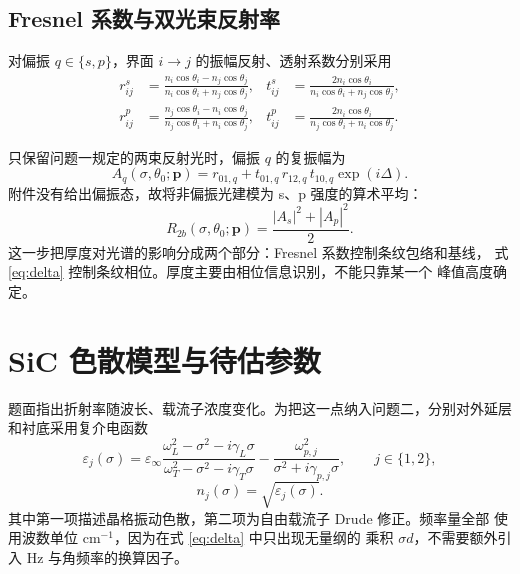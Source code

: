 \documentclass[UTF8,12pt,a4paper]{ctexart}
\begin{document}
\subsection{Fresnel 系数与双光束反射率}

对偏振 $q\in\{s,p\}$，界面 $i\to j$ 的振幅反射、透射系数分别采用
\begin{align}
 r_{ij}^{s}&=\frac{n_i\cos\theta_i-n_j\cos\theta_j}
 {n_i\cos\theta_i+n_j\cos\theta_j},
 &t_{ij}^{s}&=\frac{2n_i\cos\theta_i}
 {n_i\cos\theta_i+n_j\cos\theta_j},\\
 r_{ij}^{p}&=\frac{n_j\cos\theta_i-n_i\cos\theta_j}
 {n_j\cos\theta_i+n_i\cos\theta_j},
 &t_{ij}^{p}&=\frac{2n_i\cos\theta_i}
 {n_j\cos\theta_i+n_i\cos\theta_j}.
 \label{eq:fresnel}
\end{align}

只保留问题一规定的两束反射光时，偏振 $q$ 的复振幅为
\begin{equation}
 A_q(\sigma,\theta_0;\boldsymbol p)
 =r_{01,q}+t_{01,q}\,r_{12,q}\,t_{10,q}\exp\!\left(i\Delta\right).
 \label{eq:amplitude}
\end{equation}
附件没有给出偏振态，故将非偏振光建模为 s、p 强度的算术平均：
\begin{equation}
 R_{2b}(\sigma,\theta_0;\boldsymbol p)
 =\frac{|A_s|^2+|A_p|^2}{2}.
 \label{eq:reflectance}
\end{equation}
这一步把厚度对光谱的影响分成两个部分：Fresnel 系数控制条纹包络和基线，
式 \eqref{eq:delta} 控制条纹相位。厚度主要由相位信息识别，不能只靠某一个
峰值高度确定。

\section{SiC 色散模型与待估参数}

题面指出折射率随波长、载流子浓度变化。为把这一点纳入问题二，分别对外延层
和衬底采用复介电函数
\begin{equation}
 \varepsilon_j(\sigma)=\varepsilon_\infty
 \frac{\omega_L^2-\sigma^2-i\gamma_L\sigma}
 {\omega_T^2-\sigma^2-i\gamma_T\sigma}
 -\frac{\omega_{p,j}^2}
 {\sigma^2+i\gamma_{p,j}\sigma},
 \qquad j\in\{1,2\},
 \label{eq:ld}
\end{equation}
\begin{equation}
 n_j(\sigma)=\sqrt{\varepsilon_j(\sigma)}.
 \label{eq:index}
\end{equation}
其中第一项描述晶格振动色散，第二项为自由载流子 Drude 修正。频率量全部
使用波数单位 $\mathrm{cm}^{-1}$，因为在式 \eqref{eq:delta} 中只出现无量纲的
乘积 $\sigma d$，不需要额外引入 Hz 与角频率的换算因子。
\end{document}
